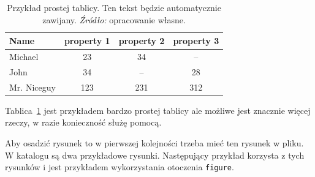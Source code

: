 \documentclass[polish, twoside, 12pt, a4paper]{article}
\theoremstyle{definition}
\theoremstyle{plain}
\theoremstyle{remark}
\begin{document}
\begin{table}[hbt]
  \centering

  \captionsetup{margin=10pt,font=small,labelfont=bf,width=.8\textwidth}

  \caption[Przykład prostej tablicy]{Przykład prostej tablicy. Ten tekst będzie automatycznie zawijany. \textit{Źródło:} opracowanie własne.}
  \label{tab:exceptional-table}

\vspace*{2ex}

  \begin{tabular}{lccc}
    Name        & property 1 & property 2 & property 3 \\ \hline
    Michael     & 23         & 34         & --         \\
    John        & 34         & --         & 28         \\
    Mr. Niceguy & 123        & 231        & 312        \\ \hline
  \end{tabular}
\end{table}

Tablica~\ref{tab:exceptional-table} jest przykładem bardzo prostej tablicy ale możliwe jest znacznie więcej rzeczy, w razie konieczność służę pomocą.

Aby osadzić rysunek to w pierwszej kolejności trzeba mieć ten rysunek w pliku. W katalogu są dwa przykładowe rysunki. Następujący przykład korzysta z tych rysunków i jest przykładem wykorzystania otoczenia \verb+figure+.
\end{document}
